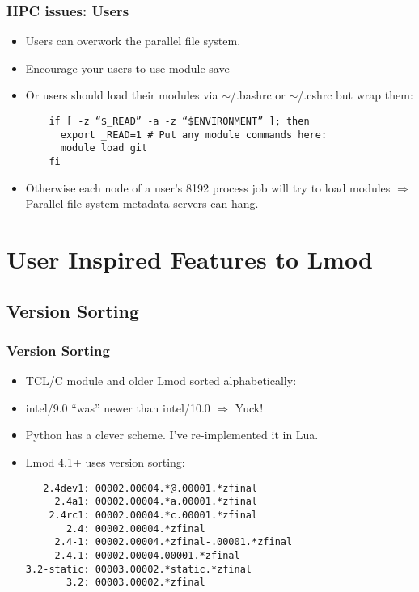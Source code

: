 \documentclass{beamer}
\begin{document}
\begin{frame}[fragile]
    \frametitle{HPC issues: Users}
  \begin{itemize}
    \item Users can overwork the parallel file system.
    \item Encourage your users to use {\color{blue}module save}
    \item Or users should load their modules via $\sim$/.bashrc or
      $\sim$/.cshrc but wrap them:
    {\small
\begin{verbatim}
    if [ -z “$_READ” -a -z “$ENVIRONMENT” ]; then
      export _READ=1 # Put any module commands here:
      module load git
    fi
\end{verbatim}
}
\item Otherwise each node of a user's 8192 process job will try to
  load modules $\Rightarrow$ Parallel file system metadata servers can hang.
  \end{itemize}
\end{frame}


\section{User Inspired Features to Lmod}
\label{sec:inspired}

\subsection{Version Sorting}
\label{sec:sorting}

\begin{frame}[fragile]
    \frametitle{Version Sorting}
  \begin{itemize}
    \item TCL/C module and older Lmod sorted alphabetically:
    \item intel/9.0 ``was'' newer than intel/10.0 $\Rightarrow$ Yuck!
    \item Python has a clever scheme.  I've re-implemented it in Lua.
    \item Lmod 4.1+ uses version sorting:
    {\small
\begin{verbatim}
   2.4dev1: 00002.00004.*@.00001.*zfinal
     2.4a1: 00002.00004.*a.00001.*zfinal
    2.4rc1: 00002.00004.*c.00001.*zfinal
       2.4: 00002.00004.*zfinal
     2.4-1: 00002.00004.*zfinal-.00001.*zfinal
     2.4.1: 00002.00004.00001.*zfinal
3.2-static: 00003.00002.*static.*zfinal
       3.2: 00003.00002.*zfinal
\end{verbatim}
}
  \end{itemize}
\end{frame}
\end{document}
